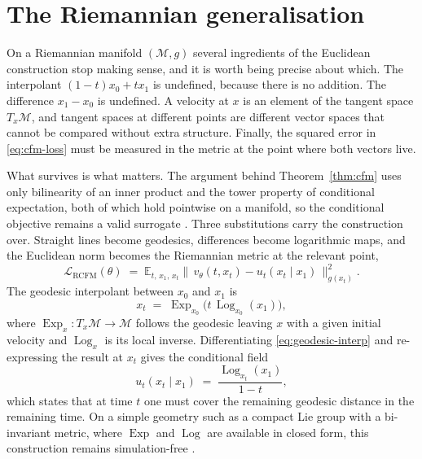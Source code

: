 \documentclass[11pt,a4paper]{report}
\theoremstyle{plain}
\theoremstyle{definition}
\theoremstyle{remark}
\newcommand{\Mfd}{\mathcal{M}}
\newcommand{\Exp}{\operatorname{Exp}}
\newcommand{\Log}{\operatorname{Log}}
\newcommand{\E}{\mathbb{E}}
\newcommand{\Loss}{\mathcal{L}}
\newcommand{\vfield}{u}
\newcommand{\pred}{v_\theta}
\begin{document}
\section{The Riemannian generalisation}
\label{sec:riemannian}

On a Riemannian manifold $(\Mfd, g)$ several ingredients of the Euclidean
construction stop making sense, and it is worth being precise about which.
The interpolant $(1-t)x_0 + t x_1$ is undefined, because there is no addition.
The difference $x_1 - x_0$ is undefined. A velocity at $x$ is an element of the
tangent space $T_x\Mfd$, and tangent spaces at different points are different
vector spaces that cannot be compared without extra structure. Finally, the
squared error in \eqref{eq:cfm-loss} must be measured in the metric at the
point where both vectors live.

What survives is what matters. The argument behind Theorem~\ref{thm:cfm} uses
only bilinearity of an inner product and the tower property of conditional
expectation, both of which hold pointwise on a manifold, so the conditional
objective remains a valid surrogate \citep{chen2024riemannian}. Three
substitutions carry the construction over. Straight lines become geodesics,
differences become logarithmic maps, and the Euclidean norm becomes the
Riemannian metric at the relevant point,
\begin{equation}
  \Loss_{\mathrm{RCFM}}(\theta)
  \;=\; \E_{t,\,x_1,\,x_t}\bigl\|\, \pred(t,x_t)
        - \vfield_t(x_t \mid x_1)\,\bigr\|^{2}_{g(x_t)} .
  \label{eq:rcfm-loss}
\end{equation}
The geodesic interpolant between $x_0$ and $x_1$ is
\begin{equation}
  x_t \;=\; \Exp_{x_0}\!\bigl(t\, \Log_{x_0}(x_1)\bigr),
  \label{eq:geodesic-interp}
\end{equation}
where $\Exp_x : T_x\Mfd \to \Mfd$ follows the geodesic leaving $x$ with a given
initial velocity and $\Log_x$ is its local inverse. Differentiating
\eqref{eq:geodesic-interp} and re-expressing the result at $x_t$ gives the
conditional field
\begin{equation}
  \vfield_t(x_t \mid x_1) \;=\; \frac{\Log_{x_t}(x_1)}{1-t},
  \label{eq:riem-target}
\end{equation}
which states that at time $t$ one must cover the remaining geodesic distance
in the remaining time. On a simple geometry such as a compact Lie group with a
bi-invariant metric, where $\Exp$ and $\Log$ are available in closed form, this
construction remains simulation-free \citep{chen2024riemannian}.
\end{document}
